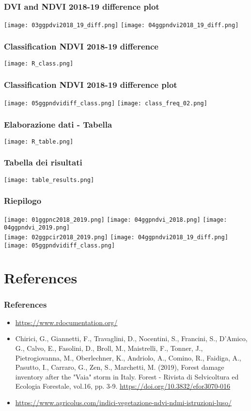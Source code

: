\documentclass{beamer}
\begin{document}
\begin{frame}
\frametitle{DVI and NDVI 2018-19 difference plot}
\centering
\texttt{[image: 03ggpdvi2018\_19\_diff.png]}
\texttt{[image: 04ggpndvi2018\_19\_diff.png]}
\end{frame}

\begin{frame}
\frametitle{Classification NDVI 2018-19 difference}
\centering
\texttt{[image: R\_class.png]}
\end{frame}

\begin{frame}
\frametitle{Classification NDVI 2018-19 difference plot}
\centering
\texttt{[image: 05ggpndvidiff\_class.png]}
\texttt{[image: class\_freq\_02.png]}
\end{frame}

\begin{frame}
\frametitle{Elaborazione dati - Tabella}
\centering
\texttt{[image: R\_table.png]}
\end{frame}

\begin{frame}
\frametitle{Tabella dei risultati}
\centering
\texttt{[image: table\_results.png]}
\end{frame}

\begin{frame}
\frametitle{Riepilogo}
\centering
\texttt{[image: 01ggpnc2018\_2019.png]}
\texttt{[image: 04ggpndvi\_2018.png]}
\texttt{[image: 04ggpndvi\_2019.png]} \\
\texttt{[image: 02ggpcir2018\_2019.png]}
\texttt{[image: 04ggpndvi2018\_19\_diff.png]}
\texttt{[image: 05ggpndvidiff\_class.png]}
\end{frame}

\section{References}
\begin{frame}
\frametitle{References}
\begin{itemize}
\scriptsize{}
\item \scriptsize{\url{https://www.rdocumentation.org/}}
\item \scriptsize{Chirici, G., Giannetti, F., Travaglini, D., Nocentini, S., Francini, S., D'Amico, G., Calvo, E., Fasolini, D., Broll, M., Maistrelli, F., Tonner, J., Pietrogiovanna, M., Oberlechner, K., Andriolo, A., Comino, R., Faidiga, A., Pasutto, I., Carraro, G., Zen, S., Marchetti, M. (2019), Forest damage inventory after the "Vaia" storm in Italy. Forest - Rivista di Selvicoltura ed Ecologia Forestale, vol.16, pp. 3-9. \url{https://doi.org/10.3832/efor3070-016}}
\item \scriptsize{\url{https://www.agricolus.com/indici-vegetazione-ndvi-ndmi-istruzioni-luso/}}
\end{itemize}
\end{frame}
\end{document}
